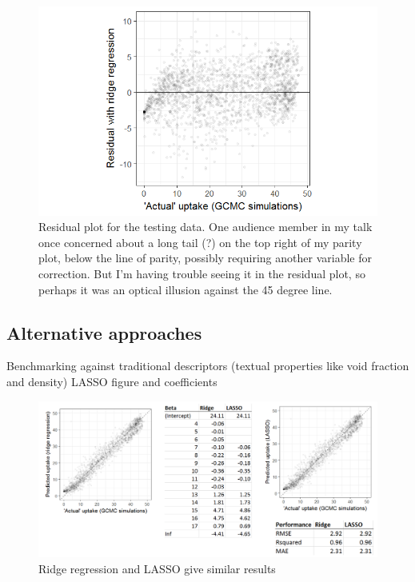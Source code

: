 \documentclass[letterpaper]{article}
\begin{document}
\begin{figure}[!ht]
	\centering
	\includegraphics[width=0.75\columnwidth]{Figs/residual.png}
	\caption{Residual plot for the testing data.  One audience member in my talk once concerned about a long tail (?) on the top right of my parity plot, below the line of parity, possibly requiring another variable for correction.  But I'm having trouble seeing it in the residual plot, so perhaps it was an optical illusion against the 45 degree line.}
	\label{fig:test_residual}
\end{figure}


\subsection{Alternative approaches}

\begin{outline}
	\1 Benchmarking against traditional descriptors (textual properties like void fraction and density)
	\1 LASSO figure and coefficients
	\begin{figure}[!ht]
		\centering
		\includegraphics[width=0.75\columnwidth]{Figs/ridge_vs_lasso.png}
		\caption{Ridge regression and LASSO give similar results}
		\label{fig:lasso}
	\end{figure}
	
\end{outline}
\end{document}
